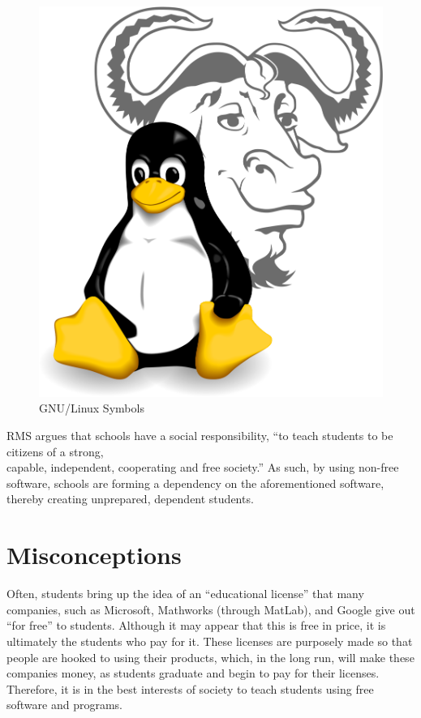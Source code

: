 \documentclass[12pt]{article}
\begin{document}
\begin{multicols}{3}
  \begin{figure}
  \includegraphics[width=\linewidth]{Images/gnulinux.png}
  \caption{\tiny GNU/Linux Symbols}
  \end{figure}

RMS argues that schools have a social responsibility, “to teach students to be citizens of a strong, \\capable, independent, cooperating and free society.” As such, by using non-free software, schools are forming a dependency on the aforementioned software, thereby creating unprepared, dependent students. 

\section*{\small Misconceptions}

Often, students bring up the idea of an “educational license” that many companies, such as Microsoft, Mathworks (through MatLab), and Google give out “for free” to students. Although it may appear that this is free in price, it is ultimately the students who pay for it. These licenses are purposely made so that people are hooked to using their products, which, in the long run, will make these companies money, as students graduate and begin to pay for their licenses. Therefore, it is in the best interests of society to teach students using free software and programs. 

 \end{multicols}
\end{document}

